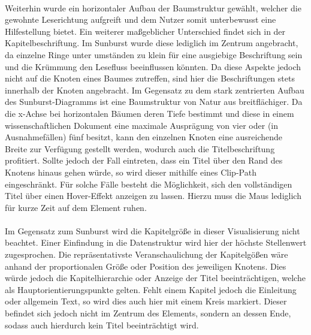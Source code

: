\\
Weiterhin wurde ein horizontaler Aufbau der Baumstruktur gew\"ahlt, welcher die gewohnte Leserichtung aufgreift und dem Nutzer somit unterbewusst eine Hilfestellung bietet. Ein weiterer ma{\ss}geblicher Unterschied findet sich in der Kapitelbeschriftung. Im Sunburst wurde diese lediglich im Zentrum angebracht, da einzelne Ringe unter umst\"anden zu klein f\"ur eine ausgiebige Beschriftung sein und die Kr\"ummung den Lesefluss beeinflussen k\"onnten. Da diese Aspekte jedoch nicht auf die Knoten eines Baumes zutreffen, sind hier die Beschriftungen stets innerhalb der Knoten angebracht. Im Gegensatz zu dem stark zentrierten Aufbau des Sunburst-Diagramms ist eine Baumstruktur von Natur aus breitfl\"achiger. Da die x-Achse bei horizontalen B\"aumen deren Tiefe bestimmt und diese in einem wissenschaftlichen Dokument eine maximale Auspr\"agung von vier oder (in Ausnahmef\"allen) f\"unf besitzt, kann den einzelnen Knoten eine ausreichende Breite zur Verf\"ugung gestellt werden, wodurch auch die Titelbeschriftung profitiert. Sollte jedoch der Fall eintreten, dass ein Titel \"uber den Rand des Knotens hinaus gehen w\"urde, so wird dieser mithilfe eines Clip-Path eingeschr\"ankt. F\"ur solche F\"alle besteht die M\"oglichkeit, sich den vollst\"andigen Titel \"uber einen Hover-Effekt anzeigen zu lassen. Hierzu muss die Maus lediglich f\"ur kurze Zeit auf dem Element ruhen.\\
\\
Im Gegensatz zum Sunburst wird die Kapitelgr\"o{\ss}e in dieser Visualisierung nicht beachtet. Einer Einfindung in die Datenstruktur wird hier der h\"ochste Stellenwert zugesprochen. Die repr\"asentativste Veranschaulichung der Kapitelg\"o{\ss}en w\"are anhand der proportionalen Gr\"o{\ss}e oder Position des jeweiligen Knotens. Dies w\"urde jedoch die Kapitelhierarchie oder Anzeige der Titel beeintr\"achtigen, welche als Hauptorientierungspunkte gelten. Fehlt einem Kapitel jedoch die Einleitung oder allgemein Text, so wird dies auch hier mit einem Kreis markiert. Dieser befindet sich jedoch nicht im Zentrum des Elements, sondern an dessen Ende, sodass auch hierdurch kein Titel beeintr\"achtigt wird. \\
\\ 
